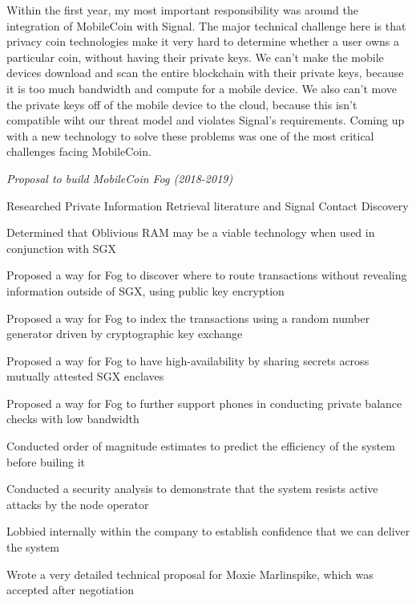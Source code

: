 \documentclass[margin,line]{resume}
\begin{document}
\begin{resume}
    Within the first year, my most important responsibility was around the integration of MobileCoin with Signal.
    The major technical challenge here is that privacy coin technologies make it very hard to determine whether a user
    owns a particular coin, without having their private keys. We can't make the mobile devices download and scan the entire
    blockchain with their private keys, because it is too much bandwidth and compute for a mobile device. We also can't move
    the private keys off of the mobile device to the cloud, because this isn't compatible wiht our threat model and
    violates Signal's requirements. Coming up with a new technology to solve these problems was one of the most critical
    challenges facing MobileCoin.

    \textsl{Proposal to build MobileCoin Fog (2018-2019)}
    \begin{list2}
    \item{Researched Private Information Retrieval literature and Signal Contact Discovery}
    \item{Determined that Oblivious RAM may be a viable technology when used in conjunction with SGX}
    \item{Proposed a way for Fog to discover where to route transactions without revealing information outside of SGX, using public key encryption}
    \item{Proposed a way for Fog to index the transactions using a random number generator driven by cryptographic key exchange}
    \item{Proposed a way for Fog to have high-availability by sharing secrets across mutually attested SGX enclaves}
    \item{Proposed a way for Fog to further support phones in conducting private balance checks with low bandwidth}
    \item{Conducted order of magnitude estimates to predict the efficiency of the system before builing it}
    \item{Conducted a security analysis to demonstrate that the system resists active attacks by the node operator}
    \item{Lobbied internally within the company to establish confidence that we can deliver the system}
    \item{Wrote a very detailed technical proposal for Moxie Marlinspike, which was accepted after negotiation}
    \end{list2}


\end{resume}
\end{document}
